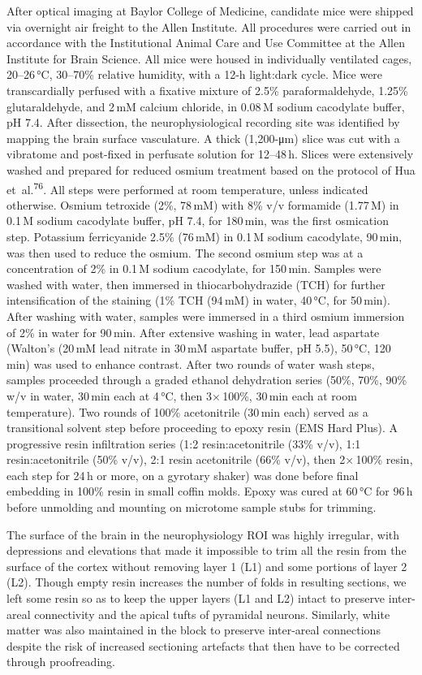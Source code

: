 \documentclass{article}
\begin{document}
After optical imaging at Baylor College of Medicine, candidate mice were shipped via overnight air freight to the Allen Institute. All procedures were carried out in accordance with the Institutional Animal Care and Use Committee at the Allen Institute for Brain Science. All mice were housed in individually ventilated cages, 20–26\,°C, 30–70\% relative humidity, with a 12-h light:dark cycle. Mice were transcardially perfused with a fixative mixture of 2.5\% paraformaldehyde, 1.25\% glutaraldehyde, and 2\,mM calcium chloride, in 0.08\,M sodium cacodylate buffer, pH 7.4. After dissection, the neurophysiological recording site was identified by mapping the brain surface vasculature. A thick (1,200-μm) slice was cut with a vibratome and post-fixed in perfusate solution for 12–48\,h. Slices were extensively washed and prepared for reduced osmium treatment based on the protocol of Hua et~al.\textsuperscript{76}. All steps were performed at room temperature, unless indicated otherwise. Osmium tetroxide (2\%, 78\,mM) with 8\% v/v formamide (1.77\,M) in 0.1\,M sodium cacodylate buffer, pH 7.4, for 180\,min, was the first osmication step. Potassium ferricyanide 2.5\% (76\,mM) in 0.1\,M sodium cacodylate, 90\,min, was then used to reduce the osmium. The second osmium step was at a concentration of 2\% in 0.1\,M sodium cacodylate, for 150\,min. Samples were washed with water, then immersed in thiocarbohydrazide (TCH) for further intensification of the staining (1\% TCH (94\,mM) in water, 40\,°C, for 50\,min). After washing with water, samples were immersed in a third osmium immersion of 2\% in water for 90\,min. After extensive washing in water, lead aspartate (Walton’s (20\,mM lead nitrate in 30\,mM aspartate buffer, pH 5.5), 50\,°C, 120\,min) was used to enhance contrast. After two rounds of water wash steps, samples proceeded through a graded ethanol dehydration series (50\%, 70\%, 90\% w/v in water, 30\,min each at 4\,°C, then 3×\,100\%, 30\,min each at room temperature). Two rounds of 100\% acetonitrile (30\,min each) served as a transitional solvent step before proceeding to epoxy resin (EMS Hard Plus). A progressive resin infiltration series (1:2 resin:acetonitrile (33\% v/v), 1:1 resin:acetonitrile (50\% v/v), 2:1 resin acetonitrile (66\% v/v), then 2×\,100\% resin, each step for 24\,h or more, on a gyrotary shaker) was done before final embedding in 100\% resin in small coffin molds. Epoxy was cured at 60\,°C for 96\,h before unmolding and mounting on microtome sample stubs for trimming.

The surface of the brain in the neurophysiology ROI was highly irregular, with depressions and elevations that made it impossible to trim all the resin from the surface of the cortex without removing layer 1 (L1) and some portions of layer 2 (L2). Though empty resin increases the number of folds in resulting sections, we left some resin so as to keep the upper layers (L1 and L2) intact to preserve inter-areal connectivity and the apical tufts of pyramidal neurons. Similarly, white matter was also maintained in the block to preserve inter-areal connections despite the risk of increased sectioning artefacts that then have to be corrected through proofreading.
\end{document}
